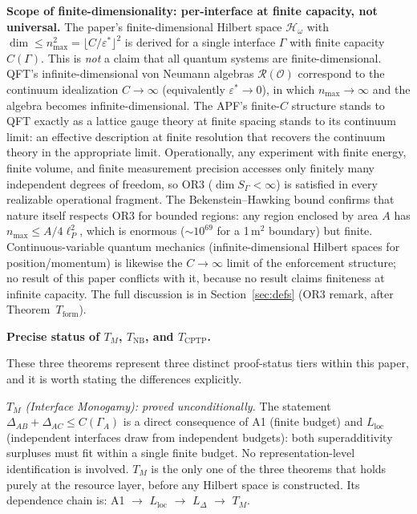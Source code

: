 \documentclass[11pt]{article}
\theoremstyle{remark}
\begin{document}
\smallskip\noindent\textbf{Scope of finite-dimensionality: per-interface at finite capacity, not universal.}
The paper's finite-dimensional Hilbert space $\mathcal{H}_\omega$ with $\dim \le n_{\max}^2 = \lfloor C/\varepsilon^* \rfloor^2$ is derived for a single interface $\Gamma$ with finite capacity $C(\Gamma)$.  This is \emph{not} a claim that all quantum systems are finite-dimensional.  QFT's infinite-dimensional von Neumann algebras $\mathcal{R}(\mathcal{O})$ correspond to the continuum idealization $C \to \infty$ (equivalently $\varepsilon^* \to 0$), in which $n_{\max} \to \infty$ and the algebra becomes infinite-dimensional.  The APF's finite-$C$ structure stands to QFT exactly as a lattice gauge theory at finite spacing stands to its continuum limit: an effective description at finite resolution that recovers the continuum theory in the appropriate limit.  Operationally, any experiment with finite energy, finite volume, and finite measurement precision accesses only finitely many independent degrees of freedom, so OR3 ($\dim S_\Gamma < \infty$) is satisfied in every realizable operational fragment.  The Bekenstein--Hawking bound confirms that nature itself respects OR3 for bounded regions: any region enclosed by area $A$ has $n_{\max} \le A/4\ell_P^2$, which is enormous ($\sim 10^{69}$ for a 1\,m$^2$ boundary) but finite.  Continuous-variable quantum mechanics (infinite-dimensional Hilbert spaces for position/momentum) is likewise the $C \to \infty$ limit of the enforcement structure; no result of this paper conflicts with it, because no result claims finiteness at infinite capacity.  The full discussion is in Section~\ref{sec:defs} (OR3 remark, after Theorem~$T_{\mathrm{form}}$).

\smallskip\noindent\textbf{Precise status of $T_M$, $T_{\mathrm{NB}}$, and $T_{\mathrm{CPTP}}$.}

These three theorems represent three distinct proof-status tiers within this paper, and it is worth stating the differences explicitly.

\smallskip\noindent\textit{$T_M$ (Interface Monogamy): proved unconditionally.}  The statement $\Delta_{AB} + \Delta_{AC} \le C(\Gamma_A)$ is a direct consequence of A1 (finite budget) and $L_{\mathrm{loc}}$ (independent interfaces draw from independent budgets): both superadditivity surpluses must fit within a single finite budget.  No representation-level identification is involved.  $T_M$ is the only one of the three theorems that holds purely at the resource layer, before any Hilbert space is constructed.  Its dependence chain is: A1 $\to$ $L_{\mathrm{loc}}$ $\to$ $L_\Delta$ $\to$ $T_M$.
\end{document}
